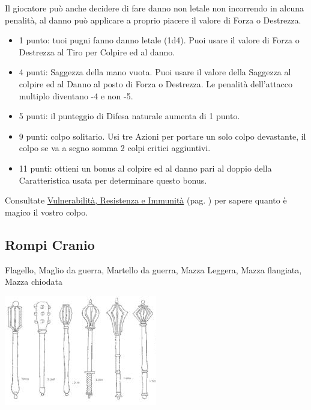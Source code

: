 \begin{multicols}{2}
Il giocatore può anche decidere di fare danno non letale non incorrendo in alcuna penalità, al danno può applicare a proprio piacere il valore di Forza o Destrezza.

\begin{itemize}[leftmargin=*] \setlength{\itemsep}{0pt}
\item 1 punto: tuoi pugni fanno danno letale (1d4). Puoi usare il valore di Forza o Destrezza al Tiro per Colpire ed al danno.
\item 4 punti: Saggezza della mano vuota. Puoi usare il valore della Saggezza al colpire ed al Danno al posto di Forza o Destrezza. Le penalità dell'attacco multiplo diventano -4 e non -5.
\item 5 punti: il punteggio di Difesa naturale aumenta di 1 punto.
\item 9 punti: colpo solitario. Usi tre Azioni per portare un solo colpo devastante, il colpo se va a segno somma 2 colpi critici aggiuntivi.
\item 11 punti: ottieni un bonus al colpire ed al danno pari al doppio della Caratteristica usata per determinare questo bonus.

\end{itemize}

Consultate \hyperlink{equivalenzaarmimagiche}{Vulnerabilità, Resistenza e Immunità} (pag. \pageref{equivalenzaarmimagiche}) per sapere quanto è magico il vostro colpo.

\subsection{Rompi Cranio} Flagello, Maglio da guerra, Martello da guerra, Mazza Leggera, Mazza flangiata, Mazza chiodata
\label{listaarmirompicranio}

\begin{center}
\includegraphics[width=0.7\linewidth]{immagini/arma-mazza3.png}
\end{center}


\end{multicols}

